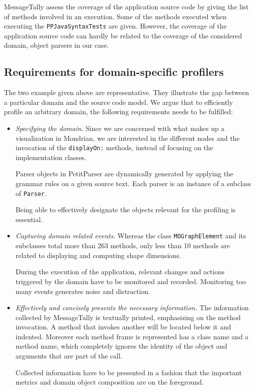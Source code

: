 \documentclass[runningheads]{llncs}
\newcommand{\ct}{\lstinline[backgroundcolor=\color{white},basicstyle=\footnotesize\ttfamily]}
\begin{document}
MessageTally assess the coverage of the application source code by giving the list of methods involved in an execution. Some of the methods executed when executing the \ct{PPJavaSyntaxTests} are given. However, the coverage of the application source code can hardly be related to the coverage of the considered domain, object parsers in our case.

\subsection{Requirements for domain-specific profilers}

The two example given above are representative. They illustrate the gap between a particular domain and the source code model. We argue that to efficiently profile an arbitrary domain, the following requirements needs to be fulfilled:

\begin{itemize}
\item \emph{Specifying the domain.} Since we are concerned with what makes up a visualization in Mondrian, we are interested in the different nodes and the invocation of the \ct{displayOn:} methods, instead of focusing on the implementation classes. 

Parser objects in PetitParser are dynamically generated by applying the grammar rules on a given source text. Each parser is an instance of a subclass of \ct{Parser}. 

Being able to effectively designate the objects relevant for the profiling is essential.

\item \emph{Capturing domain related events.}
Whereas the class \ct{MOGraphElement} and its subclasses total more than 263 methods, only less than 10 methods are related to displaying and computing shape dimensions. 

 During the execution of the application, relevant changes and actions triggered by the domain have to be monitored and recorded. Monitoring too many events generates noise and distraction. 
 
\item \emph{Effectively and concisely presents the necessary information.} 
The information collected by MessageTally is textually printed, emphasizing on the method invocation. A method that invokes another will be located below it and indented. Moreover each method frame is represented has a class name and a method name, which completely ignores the identity of the object and arguments that are part of the call.

Collected information have to be presented in a fashion that the important metrics and domain object composition are on the foreground.  

\end{itemize}
\end{document}
